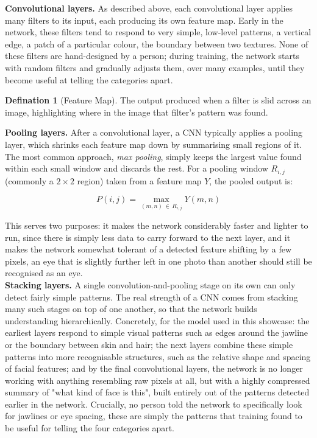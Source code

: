 \documentclass[11 pt , a 4 paper ]{article}
\theoremstyle{definition}
\newtheorem{thm}{Defination}
\begin{document}
\noindent\textbf{Convolutional layers.} As described above, each convolutional layer applies many filters to its input, each producing its own feature map. Early in the network, these filters tend to respond to very simple, low-level patterns, a vertical edge, a patch of a particular colour, the boundary between two textures. None of these filters are hand-designed by a person; during training, the network starts with random filters and gradually adjusts them, over many examples, until they become useful at telling the categories apart.
 
\begin{thm}[Feature Map]
The output produced when a filter is slid across an image, highlighting where in the image that filter's pattern was found.
\end{thm}
 
\noindent\textbf{Pooling layers.} After a convolutional layer, a CNN typically applies a pooling layer, which shrinks each feature map down by summarising small regions of it. The most common approach, \emph{max pooling}, simply keeps the largest value found within each small window and discards the rest. For a pooling window $R_{i,j}$ (commonly a $2\times2$ region) taken from a feature map $Y$, the pooled output is:
 
\begin{equation}
P(i,j) = \max_{(m,n) \,\in\, R_{i,j}} Y(m,n)
\end{equation}
 
\noindent This serves two purposes: it makes the network considerably faster and lighter to run, since there is simply less data to carry forward to the next layer, and it makes the network somewhat tolerant of a detected feature shifting by a few pixels, an eye that is slightly further left in one photo than another should still be recognised as an eye.\\
 
\noindent\textbf{Stacking layers.} A single convolution-and-pooling stage on its own can only detect fairly simple patterns. The real strength of a CNN comes from stacking many such stages on top of one another, so that the network builds understanding hierarchically. Concretely, for the model used in this showcase: the earliest layers respond to simple visual patterns such as edges around the jawline or the boundary between skin and hair; the next layers combine these simple patterns into more recognisable structures, such as the relative shape and spacing of facial features; and by the final convolutional layers, the network is no longer working with anything resembling raw pixels at all, but with a highly compressed summary of "what kind of face is this", built entirely out of the patterns detected earlier in the network. Crucially, no person told the network to specifically look for jawlines or eye spacing, these are simply the patterns that training found to be useful for telling the four categories apart.\\
 
\end{document}
